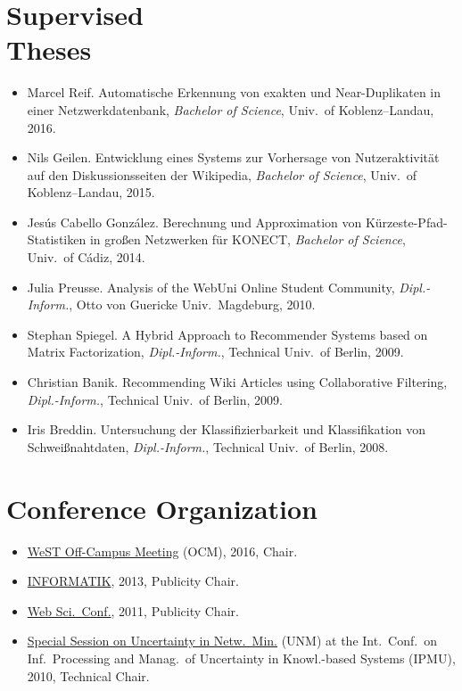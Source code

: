 \documentclass[line,mm]{res}
\newcounter{x}
\begin{document}
\begin{resume}
\section{Supervised \\ Theses}
\begin{itemize}
\item Marcel Reif.  Automatische Erkennung von exakten und
  Near-Duplikaten in einer Netzwerkdatenbank, \emph{Bachelor of
    Science}, Univ.\ of Koblenz--Landau, 2016.
\item Nils Geilen.  Entwicklung eines Systems zur Vorhersage von
  Nutzeraktivität auf den Diskussionsseiten der Wikipedia,
  \emph{Bachelor of Science}, Univ.\ of Koblenz--Landau, 2015.
\item Jesús Cabello González.  Berechnung und Approximation von
  Kürzeste-Pfad-Statistiken in großen Netzwerken für KONECT,
  \emph{Bachelor of Science}, Univ.\ of Cádiz, 2014. 
\item Julia Preusse. Analysis of the WebUni Online Student Community,
  \emph{Dipl.-Inform.}, Otto von Guericke Univ.\ Magdeburg, 2010.  
\item Stephan Spiegel.  A Hybrid Approach to Recommender Systems based
  on Matrix Factorization, \emph{Dipl.-Inform.}, Technical Univ.\ of
  Berlin, 2009.  
\item Christian Banik.  Recommending Wiki Articles using Collaborative
  Filtering, \emph{Dipl.-Inform.}, Technical Univ.\ of Berlin, 2009. 
\item Iris Breddin.  Untersuchung der Klassifizierbarkeit und
  Klassifikation von Schweißnahtdaten, \emph{Dipl.-Inform.}, Technical
  Univ.\ of Berlin, 2008.    
\end{itemize}

\section{Conference Organization}
\begin{itemize}
\item \href{https://sites.google.com/site/ocm2016/}{WeST Off-Campus
  Meeting} (OCM), 2016, Chair. 
\item \href{http://informatik2013.de/}{INFORMATIK}, 2013, Publicity Chair. 
\item \href{http://www.websci11.org/}{Web Sci.\ Conf.}, 2011,
  Publicity Chair.  
\item \href{http://www.dai-labor.de/unm2010/}{Special Session on
  Uncertainty in Netw.\ Min.} (UNM) at the Int.\ Conf.\ on Inf.\ Processing and Manag.\ of Uncertainty in Knowl.-based Systems (IPMU),
  2010, Technical Chair.   
\end{itemize}


\end{resume}
\end{document}
